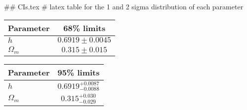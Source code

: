 ## CIs.tex
# latex table for the 1 and 2 sigma distribution of each parameter

\begin{tabular} { l  c}
 Parameter &  68\% limits\\
\hline
{\boldmath$h              $} & $0.6919\pm 0.0045          $\\
{\boldmath$\Omega_m       $} & $0.315\pm 0.015            $\\
\hline
\end{tabular}

\begin{tabular} { l  c}
 Parameter &  95\% limits\\
\hline
{\boldmath$h              $} & $0.6919^{+0.0087}_{-0.0088}$\\
{\boldmath$\Omega_m       $} & $0.315^{+0.030}_{-0.029}   $\\
\hline
\end{tabular}
